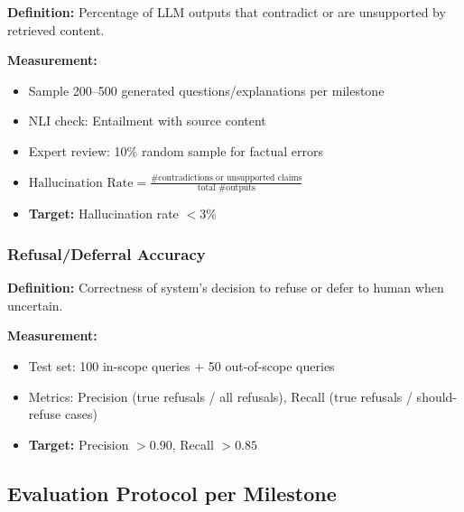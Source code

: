 \documentclass[11pt,letterpaper]{article}
\begin{document}
\textbf{Definition:} Percentage of LLM outputs that contradict or are unsupported by retrieved content.

\textbf{Measurement:}
\begin{itemize}
\item Sample 200--500 generated questions/explanations per milestone
\item NLI check: Entailment with source content
\item Expert review: 10\% random sample for factual errors
\item $\text{Hallucination Rate} = \frac{\text{\# contradictions or unsupported claims}}{\text{total \# outputs}}$
\item \textbf{Target:} Hallucination rate $< 3\%$
\end{itemize}

\subsubsection{Refusal/Deferral Accuracy}\label{subsubsec:refusal-accuracy}

\textbf{Definition:} Correctness of system's decision to refuse or defer to human when uncertain.

\textbf{Measurement:}
\begin{itemize}
\item Test set: 100 in-scope queries + 50 out-of-scope queries
\item Metrics: Precision (true refusals / all refusals), Recall (true refusals / should-refuse cases)
\item \textbf{Target:} Precision $> 0.90$, Recall $> 0.85$
\end{itemize}

\subsection{Evaluation Protocol per Milestone}\label{subsec:evaluation-protocol}
\end{document}
